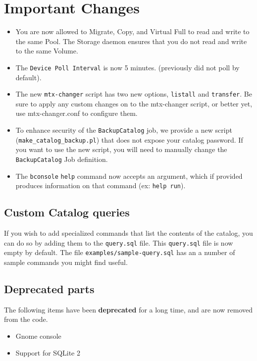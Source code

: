 \section{Important Changes}
\label{sec:importantchanges}

\begin{itemize}
\item You are now allowed to Migrate, Copy, and Virtual Full to read and write
  to the same Pool. The Storage daemon ensures that you do not read and
  write to the same Volume.
\item The \texttt{Device Poll Interval} is now 5 minutes. (previously did not
  poll by default).
\item The new \texttt{mtx-changer} script has two new options, \texttt{listall}
  and \texttt{transfer}. Be sure to apply any custom changes on to the 
  mtx-changer script, or better yet, use mtx-changer.conf to configure
  them.
\item To enhance security of the \texttt{BackupCatalog} job, we provide a new
  script (\texttt{make\_catalog\_backup.pl}) that does not expose your catalog
  password. If you want to use the new script, you will need to 
  manually change the \texttt{BackupCatalog} Job definition.
\item The \texttt{bconsole} \texttt{help} command now accepts
  an argument, which if provided produces information on that
  command (ex: \texttt{help run}).
\end{itemize}

\subsection{Custom Catalog queries}

If you wish to add specialized commands that list the contents of the catalog,
you can do so by adding them to the \texttt{query.sql} file. This
\texttt{query.sql} file is now empty by default.  The file
\texttt{examples/sample-query.sql} has an a number of sample commands
you might find useful.

\subsection{Deprecated parts}

The following items have been \textbf{deprecated} for a long time, and are now
removed from the code.
\begin{itemize}
\item Gnome console
\item Support for SQLite 2
\end{itemize}

